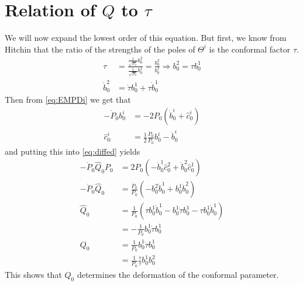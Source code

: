 \documentclass{article}
\begin{document}
\chapter{Relation of $Q$ to $\tau$}
We will now expand the lowest order of this equation. But first, we know from Hitchin that the ratio of the strengths of the poles of $\Theta^i$ is the conformal factor $\tau$.
\begin{align*}
\tau &= \frac{\frac{1}{\sqrt{P_0}} b^2_0}{\frac{1}{\sqrt{P_0}} b^1_0} = \frac{b^2_0}{b^1_0} \Rightarrow b^2_0 = \tau b^1_0 \\
\dot b^2_0 &= \dot\tau b^1_0 + \tau \dot b^1_0
\end{align*}
Then from \eqref{eq:EMPDi} we get that
\begin{align*}
-\dot P_0 b^i_0 &= -2P_0\left( \dot b^i_0 + \hat c^i_0 \right) \\
\hat c^i_0 &= \frac{1}{2}\frac{\dot P_0}{P_0}b^i_0 - \dot b^i_0
\end{align*}
and putting this into \eqref{eq:diffed} yields
\begin{align*}
-\dot P_0 \hat Q_0 P_0 &=  2P_0(-\dot b^1_0\hat c^2_0 + \dot b^2_0\hat c^1_0) \\
-\dot P_0 \hat Q_0 &=  \frac{\dot P_0}{P_0}(-b^2_0\dot b^1_0 + b^1_0\dot b^2_0) \\
\hat Q_0 &=  \frac{1}{P_0}(\tau b^1_0\dot b^1_0 - b^1_0\dot\tau b^1_0 - \tau b^1_0\dot b^1_0) \\
&=  -\frac{1}{P_0}b^1_0\dot\tau b^1_0 \\
Q_0 &=  \frac{1}{P_0}b^1_0\dot\tau b^1_0 \\
&= \frac{1}{P_0} \frac{\dot \tau}{\tau} b^1_0 b^2_0
\end{align*}
This shows that $Q_0$ determines the deformation of the conformal parameter.
\end{document}
